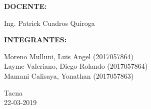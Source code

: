 \documentclass[12pt,letterpaper]{article}
\begin{document}
\begin{titlepage}
\begin{center}
\vspace*{0.3in}
\begin{Large}
\textbf{DOCENTE:} \\
\end{Large}

\vspace*{0.1in}
\begin{large}
 Ing. Patrick Cuadros Quiroga\\
\end{large}

\vspace*{0.4in}
\vspace*{0.1in}
\begin{large}
\textbf{INTEGRANTES:} \\
\begin{flushleft}
Moreno Mulluni, Luis Angel \hfill	(2017057864)\\
Layme Valeriano, Diego Rolando \hfill	(2017057864)\\
Mamani Calisaya, Yonathan \hfill	(2017057863)\\

\centering  %
\vspace*{0.9in}
\begin{large}
Tacna\\ 22-03-2019
\end{large}

\end{flushleft}
\end{large}
\end{center}

\end{titlepage}


\tableofcontents %
\thispagestyle{empty} %
\newpage
\setcounter{page}{1} %








\end{document}
